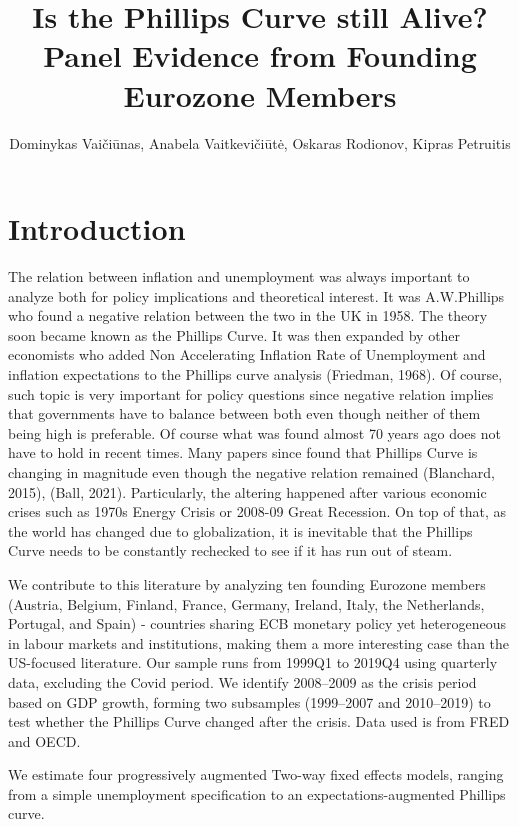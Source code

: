 \documentclass[preprint,10pt,authoryear]{elsarticle}
\begin{document}
\begin{frontmatter}

\title{Is the Phillips Curve still Alive? Panel Evidence from Founding Eurozone Members}
\author{Dominykas Vaičiūnas, Anabela Vaitkevičiūtė, Oskaras Rodionov, Kipras Petruitis}


\end{frontmatter}

\section{Introduction}

The relation between inflation and unemployment was always important  to analyze both for policy implications and theoretical interest. It was A.W.Phillips who found a negative relation between the two in the UK in 1958. The theory soon became known as the Phillips Curve. It was then expanded by other economists who added Non Accelerating Inflation Rate of Unemployment and inflation expectations to the Phillips curve analysis (Friedman, 1968). Of course, such topic is very important for policy questions since negative relation implies that governments have to balance between both even though neither of them being high is preferable. Of course what was found almost 70 years ago does not have to hold in recent times. Many papers since found that Phillips Curve is changing in magnitude even though the negative relation remained (Blanchard, 2015), (Ball, 2021). Particularly, the altering happened after various economic crises such as 1970s Energy Crisis or 2008-09 Great Recession. On top of that, as the world has changed due to globalization, it is inevitable that the Phillips Curve needs to be constantly rechecked to see if it has run out of steam.

We contribute to this literature by analyzing ten founding Eurozone members (Austria, Belgium, Finland, France, Germany, Ireland, Italy, the Netherlands, Portugal, and Spain) - countries sharing ECB monetary policy yet heterogeneous in labour markets and institutions, making them a more interesting case than the US-focused literature. Our sample runs from 1999Q1 to 2019Q4 using quarterly data, excluding the Covid period. We identify 2008–2009 as the crisis period based on GDP growth, forming two subsamples (1999–2007 and 2010–2019) to test whether the Phillips Curve changed after the crisis. Data used is from FRED and OECD.

We estimate four progressively augmented Two-way fixed effects models, ranging from a simple unemployment specification to an expectations-augmented Phillips curve. 
\end{document}
